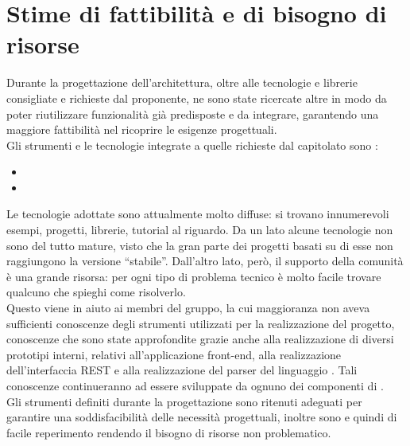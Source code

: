 \section{Stime di fattibilità e di bisogno di risorse}

Durante la progettazione dell'architettura, oltre alle tecnologie e librerie consigliate e richieste dal proponente, ne sono state ricercate altre in modo da poter riutilizzare funzionalità già predisposte e da integrare, garantendo una maggiore fattibilità nel ricoprire le esigenze progettuali. \\
Gli strumenti e le tecnologie integrate a quelle richieste dal capitolato sono : 
\begin{itemize}
\item 
\item 
\end{itemize}

Le tecnologie adottate sono attualmente molto diffuse: si trovano innumerevoli esempi, progetti, librerie, tutorial al riguardo. Da un lato alcune tecnologie non sono del tutto mature, visto che la gran parte dei progetti basati su di esse non raggiungono la versione ``stabile''. Dall'altro lato, però, il supporto della comunità è una grande risorsa: per ogni tipo di problema tecnico è molto facile trovare qualcuno che spieghi come risolverlo. \\
Questo viene in aiuto ai membri del gruppo, la cui maggioranza non aveva sufficienti conoscenze degli strumenti utilizzati per la realizzazione del progetto, conoscenze che sono state approfondite grazie anche alla realizzazione di diversi prototipi interni, relativi all'applicazione front-end, alla realizzazione dell'interfaccia REST e alla realizzazione del parser del linguaggio .
Tali conoscenze continueranno ad essere sviluppate da ognuno dei componenti di \GroupName{}. \\

Gli strumenti definiti durante la progettazione sono ritenuti adeguati per garantire una soddisfacibilità delle necessità progettuali, inoltre sono  e quindi di facile reperimento rendendo il bisogno di risorse non problematico.



